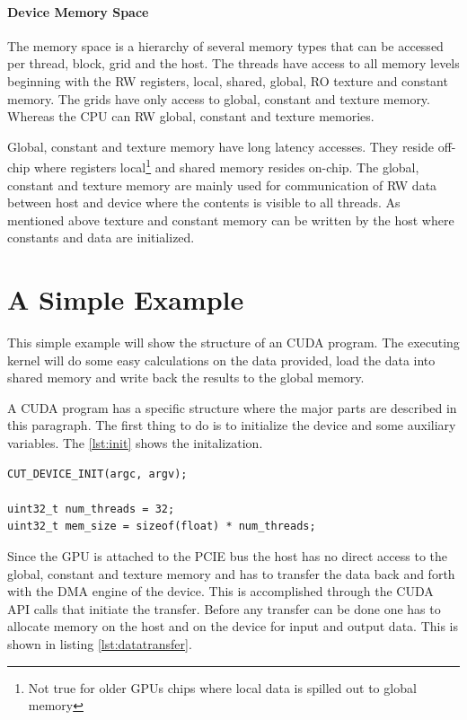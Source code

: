 \paragraph{Device Memory Space}%
\label{par:device_memory_space} 
The memory space is a hierarchy of several memory types that can be accessed per
thread, block, grid and the host. The threads have access to all memory levels
beginning with the \gls{RW} registers, local, shared, global, \gls{RO}
texture and constant memory. The grids have only access to global, constant
and texture memory. Whereas the \gls{CPU} can \gls{RW} global, constant and texture
memories.

Global, constant and texture memory have long latency accesses. They reside
off-chip where registers local\footnote{Not true for older \glspl{GPU} chips
where local data is spilled out to global memory} and shared memory resides
on-chip. The global, constant and texture memory are mainly used for
communication of \gls{RW} data between host and device where the contents is
visible to all threads. As mentioned above texture and constant memory can be
written by the host where constants and data are initialized.


\section{A Simple Example}%
\label{sub:a_simple_example} 
This simple example will show the structure of an \gls{CUDA} program. The executing
kernel will do some easy calculations on the data provided, load the data into
shared memory  and write back the results to the global memory. 

A \gls{CUDA} program has a specific structure where the major parts are
described in this paragraph. The first thing to do is to initialize the device
and some auxiliary variables. The \autoref{lst:init} shows the
initalization.

%
\begin{lstlisting}[caption=Hardware initalization, label=lst:init]
CUT_DEVICE_INIT(argc, argv);

uint32_t num_threads = 32;
uint32_t mem_size = sizeof(float) * num_threads;				
\end{lstlisting} 
%

Since the \gls{GPU} is attached to the \gls{PCIE} bus the host has no direct
access to the global, constant and texture memory and has to transfer the data
back and forth with the \gls{DMA} engine of the device. This is accomplished
through the \gls{CUDA} \gls{API} calls that initiate the transfer. Before any
transfer can be done one has to allocate memory on the host and on the device
for input and output data. This is shown in listing \autoref{lst:datatransfer}.


